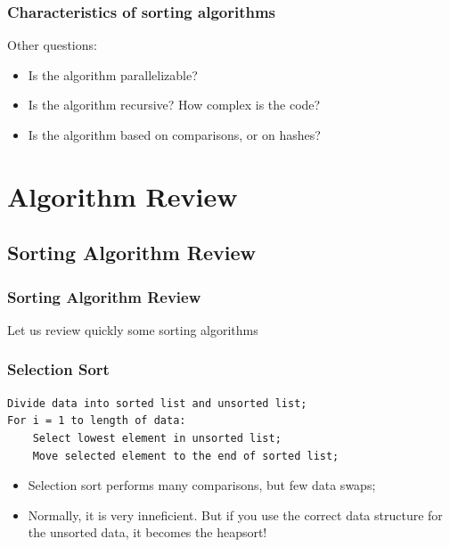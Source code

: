\documentclass{beamer}
\begin{document}
\begin{frame}
  \frametitle{Characteristics of sorting algorithms}
    Other questions:
    \begin{itemize}
    \item Is the algorithm parallelizable?
    \item Is the algorithm recursive? How complex is the code?
    \item Is the algorithm based on comparisons, or on hashes?
    \end{itemize}
\end{frame}


\section{Algorithm Review}
\subsection{Sorting Algorithm Review}

\begin{frame}
  \frametitle{Sorting Algorithm Review}
  \begin{center}
    Let us review quickly some sorting algorithms
  \end{center}
\end{frame}

\begin{frame}
  \frametitle{Selection Sort}
  \begin{block}{}
{\smaller
\begin{verbatim}
Divide data into sorted list and unsorted list;
For i = 1 to length of data:
    Select lowest element in unsorted list;
    Move selected element to the end of sorted list;
\end{verbatim}
}
  \end{block}

\begin{itemize}
\item Selection sort performs many comparisons, but few data swaps;
\item Normally, it is \alert{very inneficient}. But if you use the
  correct data structure for the unsorted data, it becomes the
   heapsort!
\end{itemize}
\end{frame}
\end{document}
